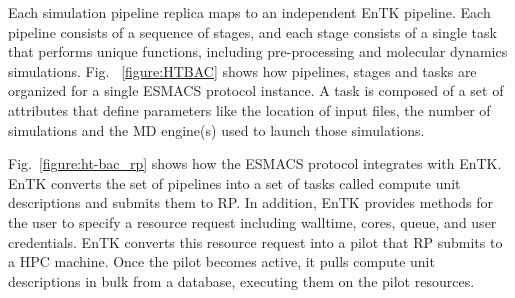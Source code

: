 \documentclass{bmcart}
\def\texttt{[image: ]}
\begin{document}


Each simulation pipeline replica maps to an independent EnTK pipeline. Each
pipeline consists of a sequence of stages, and each stage consists of a single
task that performs unique functions, including pre-processing and molecular
dynamics simulations. Fig. ~\ref{figure:HTBAC} shows how pipelines, stages and
tasks are organized for a single ESMACS protocol instance. A task is composed of a set of attributes that define parameters like the location of input files, the number of simulations and the MD engine(s) used to launch those simulations.






Fig.~\ref{figure:ht-bac_rp} shows how the ESMACS protocol integrates with
EnTK\@. EnTK converts the set of pipelines into a set of tasks called compute
unit descriptions and submits them to RP\@. In addition, EnTK provides
methods for the user to specify a resource request including walltime, cores,
queue, and user credentials. EnTK converts this resource request into a pilot
that RP submits to a HPC machine. Once the pilot becomes active, it pulls
compute unit descriptions in bulk from a database, executing them on the
pilot resources.
\end{document}
